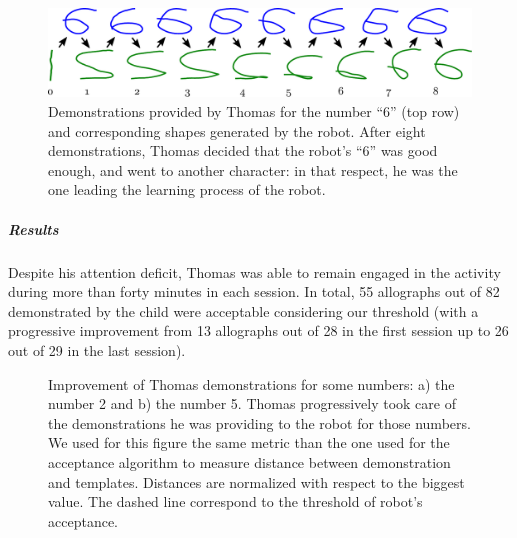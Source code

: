 \documentclass[10pt,a4paper]{article}
\begin{document}
\begin{figure}[!]
    \centering
    \includegraphics[width=0.6\linewidth]{learning_6_demos}
    \caption{\small Demonstrations provided by Thomas for the number ``6'' (top row) and
        corresponding shapes generated by the robot. After eight demonstrations,
        Thomas decided that the robot's ``6'' was good enough, and went to
    another character: in that respect, he was the one leading the learning
process of the robot.}
    \label{learning_6_demos}
\end{figure}
\subparagraph{Results}
Despite his attention deficit, Thomas was able to remain engaged in the activity during more than
forty minutes in each session. In total, 55 allographs out of 82 
demonstrated by the child were acceptable considering our threshold (with a
progressive improvement from 13 allographs out of 28 in the first session up to 26 out
of 29 in the last session).

\begin{figure}[!]
    \centering
    \caption{\small Improvement of Thomas demonstrations for some numbers: a) the number 2 and b) the number 5. Thomas progressively took care of the demonstrations he was providing to the robot for those numbers. We used for this figure the same metric than the one used for the acceptance algorithm to measure distance between demonstration and templates. Distances are normalized with respect to the biggest value. The dashed line correspond to the threshold of robot's acceptance.}
    \label{Thomas_progress}
\end{figure}
\end{document}
